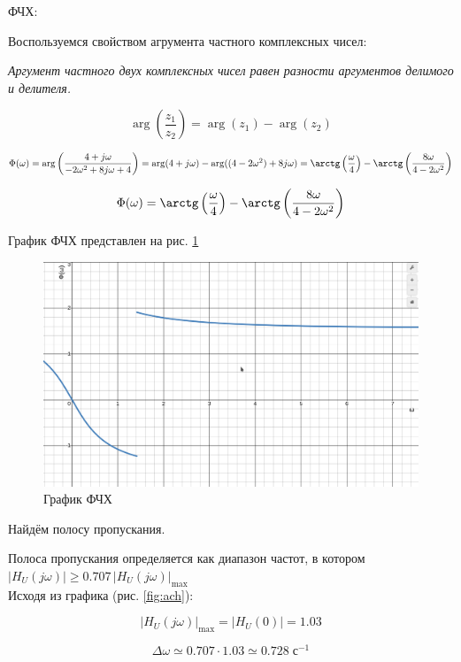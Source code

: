 ФЧХ:

Воспользуемся свойством
агрумента частного
комплексных чисел:

\textit{Аргумент частного двух комплексных чисел 
равен разности аргументов делимого и делителя.}

$$ \arg\left(\dfrac{z_1}{z_2}\right) = \arg(z_1) - \arg(z_2) $$

$
\Phi(\omega) = 
\arg\left(
    \dfrac{4 + j\omega}{-2\omega^2 + 8j\omega + 4}
\right) = 
\arg(4 + j\omega) - \arg((4 - 2\omega^2) + 8j\omega) =
\arctg\left(
    \dfrac{\omega}{4}
\right) - 
\arctg\left(
    \dfrac{8\omega}{4 - 2\omega^2}
\right)
$

\begin{equation}\label{eq:fch}
\Phi(\omega) = \arctg\left(
\dfrac{\omega}{4}
\right) - 
\arctg\left(
\dfrac{8\omega}{4 - 2\omega^2}
\right)
\end{equation}

График ФЧХ представлен на рис. \ref{fig:fch}

\begin{figure}[H]
    \centering
    \includegraphics[width=0.7\linewidth]{photo/fch}
    \caption{График ФЧХ}
    \label{fig:fch}
\end{figure}

Найдём полосу пропускания.

Полоса пропускания определяется как диапазон частот, 
в котором
$ |H_U(j\omega)| \ge 0.707\,|H_U(j\omega)|_{\max} $
\\

Исходя из графика (рис. \ref{fig:ach}):

$$ |H_U(j\omega)|_{\max} = |H_U(0)| = 1.03 $$

$$ \Delta\omega \simeq 0.707 \cdot 1.03 \simeq 0.728 \; с^{-1} $$
